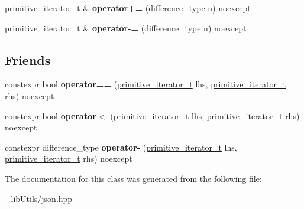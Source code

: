 \begin{DoxyCompactItemize}
\item 
\hyperlink{classnlohmann_1_1detail_1_1primitive__iterator__t}{primitive\+\_\+iterator\+\_\+t} \& {\bfseries operator+=} (difference\+\_\+type n) noexcept\hypertarget{classnlohmann_1_1detail_1_1primitive__iterator__t_aee01535df0b3b40137d9241029a9a203}{}\label{classnlohmann_1_1detail_1_1primitive__iterator__t_aee01535df0b3b40137d9241029a9a203}

\item 
\hyperlink{classnlohmann_1_1detail_1_1primitive__iterator__t}{primitive\+\_\+iterator\+\_\+t} \& {\bfseries operator-\/=} (difference\+\_\+type n) noexcept\hypertarget{classnlohmann_1_1detail_1_1primitive__iterator__t_a0bf83ab08abe1ae4b51c790c85cdf151}{}\label{classnlohmann_1_1detail_1_1primitive__iterator__t_a0bf83ab08abe1ae4b51c790c85cdf151}

\end{DoxyCompactItemize}
\subsection*{Friends}
\begin{DoxyCompactItemize}
\item 
constexpr bool {\bfseries operator==} (\hyperlink{classnlohmann_1_1detail_1_1primitive__iterator__t}{primitive\+\_\+iterator\+\_\+t} lhs, \hyperlink{classnlohmann_1_1detail_1_1primitive__iterator__t}{primitive\+\_\+iterator\+\_\+t} rhs) noexcept\hypertarget{classnlohmann_1_1detail_1_1primitive__iterator__t_aae1e1e2ec0e229d1291d69de57d76bbe}{}\label{classnlohmann_1_1detail_1_1primitive__iterator__t_aae1e1e2ec0e229d1291d69de57d76bbe}

\item 
constexpr bool {\bfseries operator$<$} (\hyperlink{classnlohmann_1_1detail_1_1primitive__iterator__t}{primitive\+\_\+iterator\+\_\+t} lhs, \hyperlink{classnlohmann_1_1detail_1_1primitive__iterator__t}{primitive\+\_\+iterator\+\_\+t} rhs) noexcept\hypertarget{classnlohmann_1_1detail_1_1primitive__iterator__t_a901a95e6d73c9509d3dcde914f6c8a9d}{}\label{classnlohmann_1_1detail_1_1primitive__iterator__t_a901a95e6d73c9509d3dcde914f6c8a9d}

\item 
constexpr difference\+\_\+type {\bfseries operator-\/} (\hyperlink{classnlohmann_1_1detail_1_1primitive__iterator__t}{primitive\+\_\+iterator\+\_\+t} lhs, \hyperlink{classnlohmann_1_1detail_1_1primitive__iterator__t}{primitive\+\_\+iterator\+\_\+t} rhs) noexcept\hypertarget{classnlohmann_1_1detail_1_1primitive__iterator__t_ac6d902d6ec9a02dabed5452d3ae78f7e}{}\label{classnlohmann_1_1detail_1_1primitive__iterator__t_ac6d902d6ec9a02dabed5452d3ae78f7e}

\end{DoxyCompactItemize}


The documentation for this class was generated from the following file\+:\begin{DoxyCompactItemize}
\item 
\+\_\+lib\+Utils/json.\+hpp\end{DoxyCompactItemize}
